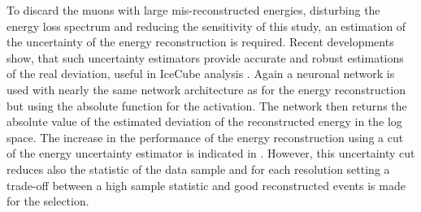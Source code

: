 
To discard the muons with large mis-reconstructed energies, disturbing the energy loss spectrum and reducing the sensitivity of this study, an estimation of the uncertainty of the energy reconstruction is required.
Recent developments show, that such uncertainty estimators provide accurate and robust estimations of the real deviation, useful in IceCube analysis \cite{Huennefeld17ICRC}.
Again a neuronal network is used with nearly the same network architecture as for the energy reconstruction but using the absolute function for the activation.
The network then returns the absolute value of the estimated deviation of the reconstructed energy in the log space.
The increase in the performance of the energy reconstruction using a cut of the energy uncertainty estimator is indicated in .
However, this uncertainty cut reduces also the statistic of the data sample and for each resolution setting a trade-off between a high sample statistic and good reconstructed events is made for the selection.

